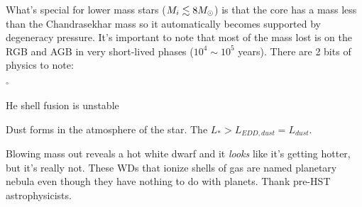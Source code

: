 What's special for lower mass stars ($M_i \lesssim 8M_\odot$) is that the core has a mass less than the Chandrasekhar mass so it automatically becomes supported by degeneracy pressure. It's important to note that most of the mass lost is on the RGB and AGB in very short-lived phases ($10^4 \sim 10^5$ years). There are 2 bits of physics to note:
\begin{list}{$^\circ$}{}
\item He shell fusion is unstable 
\item Dust forms in the atmosphere of the star. The $L_* > L_{EDD,dust} = L_{dust}$.
\end{list}
Blowing mass out reveals a hot white dwarf and it \textit{looks} like it's getting hotter, but it's really not. These WDs that ionize shells of gas are named planetary nebula even though they have nothing to do with planets. Thank pre-HST astrophysicists. 

